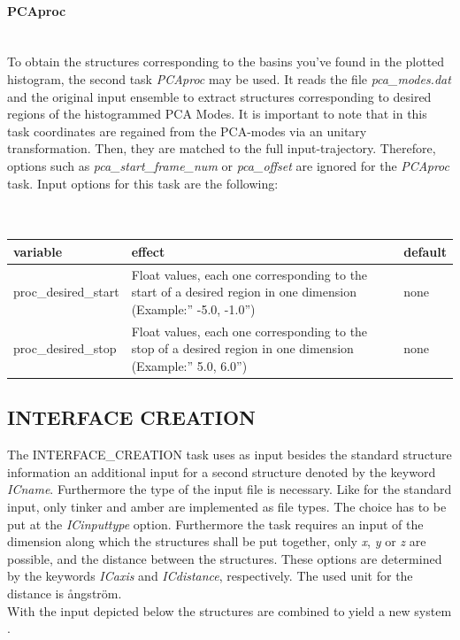 \documentclass[10pt,a4paper]{article} %
\begin{document}
	\paragraph{PCAproc}~ \\
	To obtain the structures corresponding to the basins you've found in the plotted histogram, the second task \textit{PCAproc} may be used. It reads the file \textit{pca\_modes.dat} and the original input ensemble to extract structures corresponding to desired regions of the histogrammed \ac{PCA} Modes. It is important to note that in this task coordinates are regained from the PCA-modes via an unitary transformation. Then, they are matched to the full input-trajectory. Therefore, options such as \textit{pca\_start\_frame\_num} or \textit{pca\_offset} are ignored for the \textit{PCAproc} task. Input options for this task are the following:\\~\\~\\
	\begin{longtable}{|p{3.5cm}|p{5cm}|p{2.5cm}|}
		variable & effect & default\\
		\hline			
		proc\_desired\_start & Float values, each one corresponding to the start of a desired region in one dimension (Example:'' -5.0, -1.0'') & none\\
		proc\_desired\_stop & Float values, each one corresponding to the stop of a desired region in one dimension (Example:'' 5.0, 6.0'') & none\\
	\end{longtable}

	\subsection{INTERFACE CREATION}
	The INTERFACE\_CREATION task uses as input besides the standard structure information an additional input for a second structure denoted by the keyword \textit{ICname}. Furthermore the type of the input file is necessary. Like for the standard input, only tinker and amber are implemented as file types. The choice has to be put at the \textit{ICinputtype} option. Furthermore the task requires an input of the dimension along which the structures shall be put together, only \textit{x}, \textit{y} or \textit{z} are possible, and the distance between the structures. These options are determined by the keywords \textit{ICaxis} and \textit{ICdistance}, respectively. The used unit for the distance is \aa ngström.\\
With the input depicted below the structures are combined to yield a new system .
\end{document}
